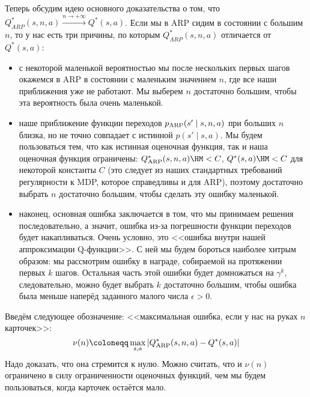 Теперь обсудим идею основного доказательства о том, что $Q^*_{ARP}(s, n, a) \xrightarrow{ n \to +\infty } Q^*(s, a)$. Если мы в ARP сидим в состоянии с большим $n$, то у нас есть три причины, по которым $Q^*_{ARP}(s, n, a)$ отличается от $Q^*(s, a)$:
\begin{itemize}
    \item с некоторой маленькой вероятностью мы после нескольких первых шагов окажемся в ARP в состоянии с маленьким значением $n$, где все наши приближения уже не работают. Мы выберем $n$ достаточно большим, чтобы эта вероятность была очень маленькой.
    \item наше приближение функции переходов $p_{\mathrm{ARP}}(s' \mid s, n, a)$ при больших $n$ близка, но не точно совпадает с истинной $p(s' \mid s, a)$. Мы будем пользоваться тем, что как истинная оценочная функция, так и наша оценочная функция ограничены: $Q_{\ARP}^*(s, n, a) \HM< C$, $Q^*(s, a) \HM< C$ для некоторой константы $C$ (это следует из наших стандартных требований регулярности к MDP, которое справедливы и для ARP), поэтому достаточно выбрать $n$ достаточно большим, чтобы сделать эту ошибку маленькой.
    \item наконец, основная ошибка заключается в том, что мы принимаем решения последовательно, а значит, ошибка из-за погрешности функции переходов будет накапливаться. Очень условно, это <<ошибка внутри нашей аппроксимации Q-функции>>. С ней мы будем бороться наиболее хитрым образом: мы рассмотрим ошибку в награде, собираемой на протяжении первых $k$ шагов. Остальная часть этой ошибки будет домножаться на $\gamma^k$, следовательно, можно будет выбрать $k$ достаточно большим, чтобы ошибка была меньше наперёд заданного малого числа $\epsilon > 0$.
\end{itemize}

Введём следующее обозначение: <<максимальная ошибка, если у нас на руках $n$ карточек>>:
$$\nu(n) \coloneqq \max_{s, a} |Q_{\ARP}^*(s, n, a) - Q^*(s, a)|$$
Надо доказать, что она стремится к нулю. Можно считать, что и $\nu(n)$ ограничено в силу ограниченности оценочных функций, чем мы будем пользоваться, когда карточек остаётся мало.

